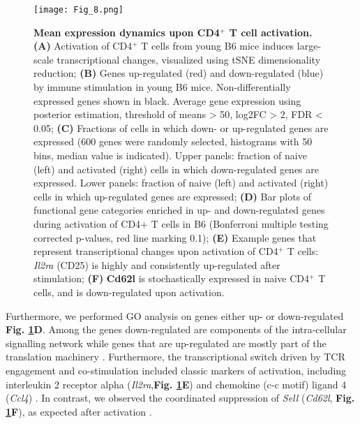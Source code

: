 \begin{figure}[!ht]
\centering
\texttt{[image: Fig\_8.png]}
\caption[Mean expression dynamics upon CD4$^+$ T cell activation]{\textbf{Mean expression dynamics upon CD4$^+$ T cell activation.}\\
\textbf{(A)} Activation of CD4$^+$ T cells from young B6 mice induces large-scale transcriptional changes, visualized using tSNE dimensionality reduction; \textbf{(B)} Genes up-regulated (red) and down-regulated (blue) by immune stimulation in young B6 mice. Non-differentially expressed genes shown in black. Average gene expression using posterior estimation, threshold of means > 50, log2FC > 2, FDR < 0.05; \textbf{(C)} Fractions of cells in which down- or up-regulated genes are expressed (600 genes were randomly selected, histograms with 50 bins, median value is indicated). Upper panels: fraction of naive (left) and activated (right) cells in which down-regulated genes are expressed. Lower panels: fraction of naive (left) and activated (right) cells in which up-regulated genes are expressed; \textbf{(D)} Bar plots of functional gene categories enriched in up- and down-regulated genes during activation of CD4+ T cells in B6 (Bonferroni multiple testing corrected p-values, red line marking 0.1); \textbf{(E)} Example genes that represent transcriptional changes upon activation of CD4$^+$ T cells: \textit{Il2ra} (CD25) is highly and consistently up-regulated after stimulation; \textbf{(F)} \textbf{Cd62l} is stochastically expressed in naive CD4$^+$ T cells, and is down-regulated upon activation.
}
\label{fig1:immune_activation}
\end{figure}

Furthermore, we performed GO analysis on genes either up- or down-regulated \textbf{Fig. \ref{fig1:immune_activation}D}. Among the genes down-regulated are components of the intra-cellular signalling network while genes that are up-regulated are mostly part of the translation machinery \citep{Bjur2013}. Furthermore, the transcriptional switch driven by TCR engagement and co-stimulation included classic markers of activation, including interleukin 2 receptor alpha (\textit{Il2ra},\textbf{Fig. \ref{fig1:immune_activation}E}) and chemokine (c-c motif) ligand 4 (\textit{Ccl4}) \citep{Asmal2003}. In contrast, we observed the coordinated suppression of \textit{Sell} (\textit{Cd62l}, \textbf{Fig. \ref{fig1:immune_activation}F}), as expected after activation \todo{[REF]}.


